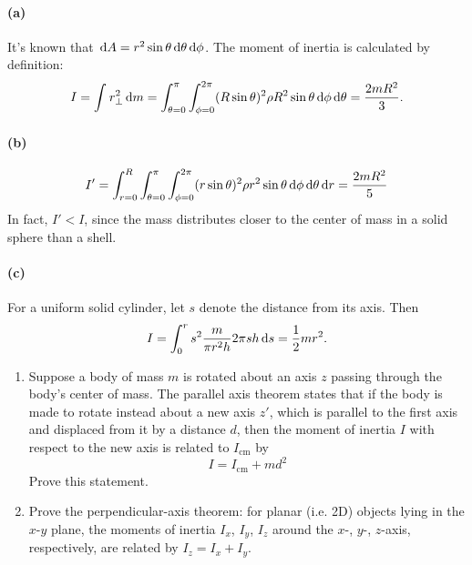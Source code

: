 \documentclass{article}
\begin{document}
\begin{solution}
	\paragraph{(a)} It's known that $\,\mathrm{d} A = r^2 \sin \theta \,\mathrm{d} \theta \,\mathrm{d} \phi$. The moment of inertia is calculated by definition: 
	\[ I = \int_{}^{}r_\perp^2 \,\mathrm{d} m 
	= \int_{\theta = 0}^{\pi} \int_{\phi = 0}^{2\pi} (R \sin \theta)^2 \rho R^2 \sin \theta \,\mathrm{d} \phi \,\mathrm{d} \theta = \frac{2mR^2}{3}. \]

	\paragraph{(b)} 
	\[ I' = \int_{r = 0}^{R} \int_{\theta = 0}^{\pi} \int_{\phi = 0}^{2\pi} (r \sin \theta)^2 \rho r^2 \sin \theta \,\mathrm{d} \phi \,\mathrm{d} \theta \,\mathrm{d} r = \frac{2mR^2}{5} \]
	In fact, $I' < I$, since the mass distributes closer to the center of mass in a solid sphere than a shell. 

	\paragraph{(c)} For a uniform solid cylinder, let $s$ denote the distance from its axis. Then
	\[ I = \int_0^r s^2 \frac{m}{\pi r^2h} 2\pi s h \,\mathrm{d} s = \frac{1}{2}mr^2. \]
\end{solution}



\begin{problem}
\begin{enumerate}
  \item[a)] Suppose a body of mass $m$ is rotated about an axis $z$ passing through the body's center of mass. The parallel axis theorem states that if the body is made to rotate instead about a new axis $z'$, which is parallel to the first axis and displaced from it by a distance $d$, then the moment of inertia $I$ with respect to the new axis is related to $I_{\mathrm{cm}}$ by
  \[
    I=I_{\mathrm{cm}}+md^2
  \]
  Prove this statement.
  \begin{center}
    \resizebox{!}{4.1cm}{}
  \end{center}
  \item[b)] Prove the perpendicular-axis theorem: for planar (i.e. 2D) objects lying in the $x$-$y$ plane, the moments of inertia $I_x$, $I_y$, $I_z$ around the $x$-, $y$-, $z$-axis, respectively, are related by $I_z=I_x+I_y$.
\end{enumerate}
\end{problem}
\end{document}
